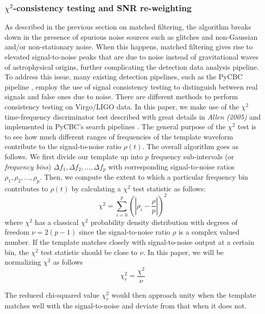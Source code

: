 \documentclass[preprint,
letterpaper,
 amsmath,amssymb,
 aps,
]{revtex4-2}
\begin{document}
\subsubsection{$\chi^2$-consistency testing and SNR re-weighting} \label{chisqaured}

As described in the previous section on matched filtering, the algorithm breaks down in the presence of spurious noise sources such as glitches and non-Gaussian and/or non-stationary noise. When this happens, matched filtering gives rise to elevated signal-to-noise peaks that are due to noise instead of gravitational waves of astrophysical origins, further complicating the detection data analysis pipeline. To address this issue, many existing detection pipelines, such as the PyCBC pipeline \cite{veto}, employ the use of signal consistency testing to distinguish between real signals and false ones due to noise. There are different methods to perform consistency testing on Virgo/LIGO data. In this paper, we make use of the $\chi^2$ time-frequency discriminator test described with great details in \textit{Allen (2005)} \cite{Allen_2005} and implemented in PyCBC's search pipelines \cite{pycbc}. The general purpose of the $\chi^2$ test is to see how much different ranges of frequencies of the template waveform contribute to the signal-to-noise ratio $\rho(t)$. The overall algorithm goes as follows. We first divide our template up into $p$ frequency sub-intervals (or\textit{ frequency bins}) $\Delta f_1,\Delta f_2,..., \Delta f_p$ with corresponding signal-to-noise ratios $\rho_1,\rho_2,...,\rho_p$. Then, we compute the extent to which a particular frequency bin contributes to $\rho(t)$ by calculating a $\chi^2$ test statistic as follows:
\begin{equation} 
    \chi^2 = \sum^p_{i=0}\left(\left|\rho_i - \frac{\rho}{p}\right|\right)^2
\end{equation}
where $\chi^2$ has a classical $\chi^2$ probability density distribution with degrees of freedom $\nu = 2(p-1)$ since the signal-to-noise ratio $\rho$ is a complex valued number. If the template matches closely with signal-to-noise output at a certain bin, the $\chi^2$ test statistic should be close to $\nu$. In this paper, we will be normalizing $\chi^2$ as follows 
\begin{equation}
    \chi^2_{r} = \frac{\chi^2}{\nu}
\end{equation}

The reduced chi-squared value $\chi^2_r$ would then approach unity when the template matches well with the signal-to-noise and deviate from that when it does not.
\end{document}
